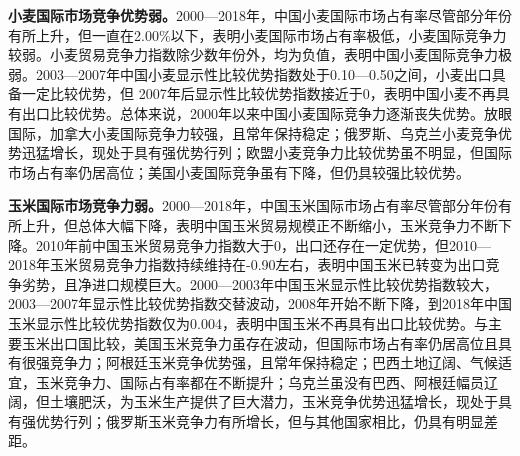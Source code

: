 \documentclass{progbookcn}
\begin{document}
\textbf{小麦国际市场竞争优势弱。}2000—2018年，中国小麦国际市场占有率尽管部分年份有所上升，但一直在2.00\%以下，表明小麦国际市场占有率极低，小麦国际竞争力较弱。小麦贸易竞争力指数除少数年份外，均为负值，表明中国小麦国际竞争力极弱。2003—2007年中国小麦显示性比较优势指数处于0.10—0.50之间，小麦出口具备一定比较优势，但 2007年后显示性比较优势指数接近于0，表明中国小麦不再具有出口比较优势。总体来说，2000年以来中国小麦国际竞争力逐渐丧失优势。放眼国际，加拿大小麦国际竞争力较强，且常年保持稳定；俄罗斯、乌克兰小麦竞争优势迅猛增长，现处于具有强优势行列；欧盟小麦竞争力比较优势虽不明显，但国际市场占有率仍居高位；美国小麦国际竞争虽有下降，但仍具较强比较优势。

\textbf{玉米国际市场竞争力弱。}2000—2018年，中国玉米国际市场占有率尽管部分年份有所上升，但总体大幅下降，表明中国玉米贸易规模正不断缩小，玉米竞争力不断下降。2010年前中国玉米贸易竞争力指数大于0，出口还存在一定优势，但2010—2018年玉米贸易竞争力指数持续维持在-0.90左右，表明中国玉米已转变为出口竞争劣势，且净进口规模巨大。2000—2003年中国玉米显示性比较优势指数较大，2003—2007年显示性比较优势指数交替波动，2008年开始不断下降，到2018年中国玉米显示性比较优势指数仅为0.004，表明中国玉米不再具有出口比较优势。与主要玉米出口国比较，美国玉米竞争力虽存在波动，但国际市场占有率仍居高位且具有很强竞争力；阿根廷玉米竞争优势强，且常年保持稳定；巴西土地辽阔、气候适宜，玉米竞争力、国际占有率都在不断提升；乌克兰虽没有巴西、阿根廷幅员辽阔，但土壤肥沃，为玉米生产提供了巨大潜力，玉米竞争优势迅猛增长，现处于具有强优势行列；俄罗斯玉米竞争力有所增长，但与其他国家相比，仍具有明显差距。
\end{document}
